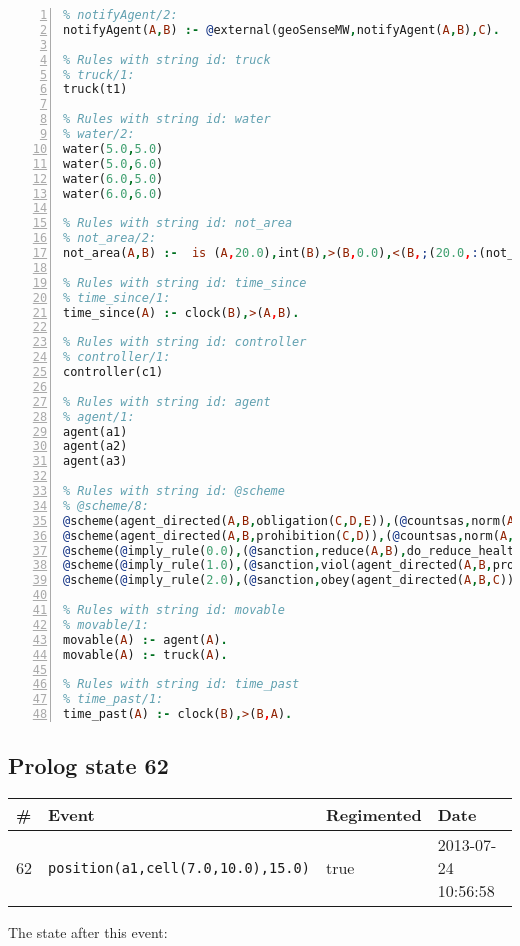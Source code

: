 \documentclass[11pt]{article}\usepackage[utf8]{inputenc}\usepackage{geometry}
\begin{document}
\begin{lstlisting}[language=Prolog, numbers=left]
% Rules with string id: notifyAgent
% notifyAgent/2:
notifyAgent(A,B) :- @external(geoSenseMW,notifyAgent(A,B),C).

% Rules with string id: truck
% truck/1:
truck(t1)

% Rules with string id: water
% water/2:
water(5.0,5.0)
water(5.0,6.0)
water(6.0,5.0)
water(6.0,6.0)

% Rules with string id: not_area
% not_area/2:
not_area(A,B) :-  is (A,20.0),int(B),>(B,0.0),<(B,;(20.0,:(not_area(A,B), is (-(B),20.0)))),int(A),>(A,0.0),<(A,;(20.0,:(area(A,B),-(int(A))))),int(B),>(A,0.0),>(B,0.0),<(A,21.0),<(B,21.0).

% Rules with string id: time_since
% time_since/1:
time_since(A) :- clock(B),>(A,B).

% Rules with string id: controller
% controller/1:
controller(c1)

% Rules with string id: agent
% agent/1:
agent(a1)
agent(a2)
agent(a3)

% Rules with string id: @scheme
% @scheme/8:
@scheme(agent_directed(A,B,obligation(C,D,E)),(@countsas,norm(A,B,F,obligation(C,D,E)),F),false,(listTrue(C)),(time_past(D)),false,[plus(viol(agent_directed(A,B,obligation(C,D,E))))|[]],[plus(obey(agent_directed(A,B,obligation(C,D,E))))|[]])
@scheme(agent_directed(A,B,prohibition(C,D)),(@countsas,norm(A,B,E,prohibition(C,D)),E),(listTrue(C)),false,(false),false,[plus(viol(agent_directed(A,B,prohibition(C,D))))|[]],[plus(obey(agent_directed(A,B,prohibition(C,D))))|[]])
@scheme(@imply_rule(0.0),(@sanction,reduce(A,B),do_reduce_health(A,B),notifyAgent(A,changed(status))),true,false,false,false,[min(reduce(A,B))|[]],[])
@scheme(@imply_rule(1.0),(@sanction,viol(agent_directed(A,B,prohibition(C,D))),do_sanction(D)),true,false,false,false,[min(viol(agent_directed(A,B,prohibition(C,D))))|[]],[])
@scheme(@imply_rule(2.0),(@sanction,obey(agent_directed(A,B,C))),true,false,false,false,[min(obey(agent_directed(A,B,C)))|[]],[])

% Rules with string id: movable
% movable/1:
movable(A) :- agent(A).
movable(A) :- truck(A).

% Rules with string id: time_past
% time_past/1:
time_past(A) :- clock(B),>(B,A).

\end{lstlisting}
\clearpage 
\subsection{Prolog state 62}
\begin{table}[ht]
\centering 
\begin{tabular}{l l l l} 
\textbf{\#} & \textbf{Event} & \textbf{Regimented} & \textbf{Date} \\ [0.5ex] 
\hline
62&\texttt{position(a1,cell(7.0,10.0),15.0)}&true&2013-07-24 10:56:58\\ [1ex] \hline\end{tabular}
\end{table}
The state after this event:
\end{document}
